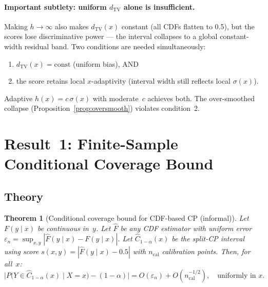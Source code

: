 \documentclass[11pt]{article}
\newtheorem{theorem}{Theorem}
\begin{document}
\paragraph{Important subtlety: uniform $d_{\mathrm{TV}}$ alone is
insufficient.}
Making $h \to \infty$ also makes $d_{\mathrm{TV}}(x)$ constant (all
CDFs flatten to 0.5), but the scores lose discriminative power ---
the interval collapses to a global constant-width residual band.
Two conditions are needed simultaneously:
\begin{enumerate}
  \item $d_{\mathrm{TV}}(x) = \text{const}$ (uniform bias), AND
  \item the score retains local $x$-adaptivity (interval width still
    reflects local $\sigma(x)$).
\end{enumerate}
Adaptive $h(x) = c\,\sigma(x)$ with moderate~$c$ achieves both.
The over-smoothed collapse (Proposition~\ref{prop:oversmooth}) violates
condition~2.


\section{Result~1: Finite-Sample Conditional Coverage Bound}
\label{sec:result1}

\subsection{Theory}

\begin{theorem}[Conditional coverage bound for CDF-based CP (informal)]
\label{thm:cov-bound}
Let $F(y \mid x)$ be continuous in~$y$. Let $\hat F$ be any CDF
estimator with uniform error
$\varepsilon_n = \sup_{x,y}|\hat F(y\mid x) - F(y\mid x)|$.
Let $\hat C_{1-\alpha}(x)$ be the split-CP interval using score
$s(x,y) = |\hat F(y \mid x) - 0.5|$ with $n_{\mathrm{cal}}$
calibration points. Then, for all~$x$:
\[
  \bigl| P\bigl(Y \in \hat C_{1-\alpha}(x) \mid X = x\bigr)
  - (1 - \alpha) \bigr|
  = O(\varepsilon_n) + O(n_{\mathrm{cal}}^{-1/2}),
  \quad \text{uniformly in } x.
\]
\end{theorem}
\end{document}
